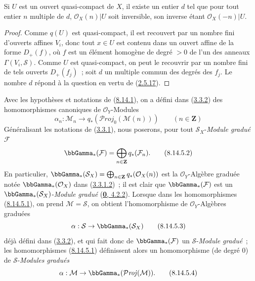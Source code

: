 \begin{proposition}[8.14.4]
\label{II.8.14.4-fr}
Si $U$ est un ouvert quasi-compact de $X$, il existe un entier $d$ tel que
pour tout entier $n$ multiple de $d$, $\mathcal{O}_X(n)|U$ soit inversible,
son inverse étant $\mathcal{O}_X(-n)|U$.
\end{proposition}

\begin{proof}
Comme $q(U)$ est quasi-compact, il est recouvert par un nombre fini d'ouverts
affines $V_i$, donc tout $x\in U$ est contenu dans un ouvert affine de la
forme $D_+(f)$, où $f$ est un élément homogène de degré $>0$ de l'un des
anneaux $\Gamma(V_i,\mathcal{S})$. Comme $U$ est quasi-compact, on peut le
recouvrir par un nombre fini de tels ouverts $D_+(f_j)$~; soit $d$ un
multiple commun des degrés des $f_j$. Le nombre $d$ répond à la question en
vertu de (\hyperref[II.2.5.17-fr]{2.5.17}).
\end{proof}

\begin{env}[8.14.5]
\label{II.8.14.5-fr}
Avec les hypothèses et notations de (\hyperref[II.8.14.1-fr]{8.14.1}), on a
défini dans (\hyperref[II.3.3.2-fr]{3.3.2}) des homomorphismes canoniques de
$\mathcal{O}_Y$-Modules
\begin{equation}
\label{II.8.14.5.1-fr}
  \alpha_n:\mathcal{M}_n\to
  q_*(\mathcal{P}\mathit{roj}_0(\mathcal{M}(n)))
  \qquad(n\in\mathbf{Z})
\tag{8.14.5.1}
\end{equation}
Généralisant les notations de (\hyperref[II.3.3.1-fr]{3.3.1}), nous
poserons, pour tout $\mathcal{S}_X$-\emph{Module gradué} $\mathcal{F}$
\begin{equation}
\label{II.8.14.5.2-fr}
  \bbGamma_*(\mathcal{F})=
  \bigoplus_{n\in\mathbf{Z}}q_*(\mathcal{F}_n).
\tag{8.14.5.2}
\end{equation}
En particulier,
$\bbGamma_*(\mathcal{S}_X)=\bigoplus_{n\in\mathbf{Z}}q_*(\mathcal{O}_X(n))$
est la $\mathcal{O}_Y$-Algèbre graduée notée
$\bbGamma_*(\mathcal{O}_X)$ dans
(\hyperref[II.3.3.1.2-fr]{3.3.1.2})~; il est clair que
$\bbGamma_*(\mathcal{F})$ est un $\bbGamma_*(\mathcal{S}_X)$-\emph{Module gradué}
(\hyperref[0.4.2.2-fr]{\textbf{0}, 4.2.2}). Lorsque
dans les homomorphismes (\hyperref[II.8.14.5.1-fr]{8.14.5.1}), on prend
$\mathcal{M}=\mathcal{S}$, on obtient l'homomorphisme de
$\mathcal{O}_Y$-Algèbres graduées
\begin{equation}
\label{II.8.14.5.3-fr}
  \alpha:\mathcal{S}\to\bbGamma_*(\mathcal{S}_X)
\tag{8.14.5.3}
\end{equation}
déjà défini dans (\hyperref[II.3.3.2-fr]{3.3.2}), et qui fait donc de
$\bbGamma_*(\mathcal{F})$ un $\mathcal{S}$-\emph{Module gradué}~; les homomorphismes
(\hyperref[II.8.14.5.1-fr]{8.14.5.1}) définissent alors un homomorphisme (de
degré $0$) de $\mathcal{S}$-\emph{Modules gradués}
\begin{equation}
\label{II.8.14.5.4-fr}
  \alpha:\mathcal{M}\to\bbGamma_*(\mathcal{P}\mathit{roj}(\mathcal{M})).
\tag{8.14.5.4}
\end{equation}
\end{env}


